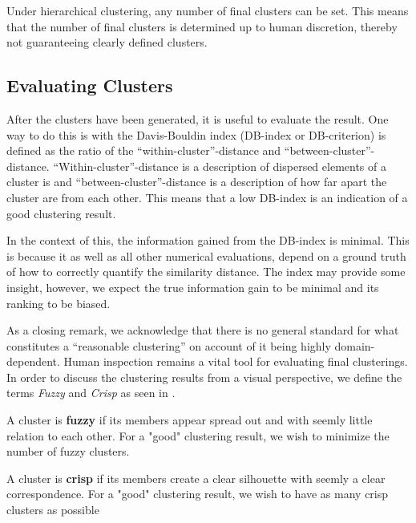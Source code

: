  
Under hierarchical clustering, any number of final clusters can be set. 
This means that the number of final clusters is determined up to human discretion, thereby not guaranteeing clearly defined clusters.

 
\subsection{Evaluating Clusters}
 After the clusters have been generated, it is useful to evaluate the result.
One way to do this is with the Davis-Bouldin index (DB-index or DB-criterion) is defined as the ratio of the “within-cluster”-distance and “between-cluster”-distance. “Within-cluster”-distance is a description of dispersed elements of a cluster is and “between-cluster”-distance  is a description of how far apart the cluster are from each other. This means that a low DB-index is an indication of a good clustering result. 

In the context of this, the information gained from the DB-index is minimal.
This is because it as well as all other numerical evaluations,  depend on a ground truth of how to correctly quantify the similarity distance. 
The index may provide some insight, however, we expect the true information gain to be minimal and its ranking to be biased.


As a closing remark, we acknowledge that there is no general standard for what constitutes a “reasonable clustering” on account of it being highly domain-dependent.
Human inspection remains a vital tool for evaluating final clusterings\cite{79-SilhouetteAnalysis}. 
In order to discuss the clustering results from a visual perspective, we define the terms \textit{Fuzzy} and \textit{Crisp} as seen in .

\begin{definition}\label{def:cluster_defs_fuzz}
A cluster is \textbf{fuzzy} if its members appear spread out and with seemly little relation to each other.  
For a "good" clustering result, we wish to minimize the number of fuzzy clusters. 

\end{definition}

\begin{definition}\label{def:cluster_defs_cri}
A cluster is \textbf{crisp} if its members create a clear silhouette with seemly a clear correspondence.
For a "good" clustering result, we wish to have as many crisp clusters as possible 
\end{definition}
